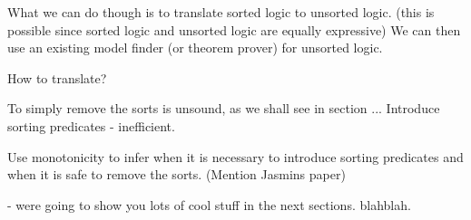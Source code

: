 What we can do though is to translate sorted logic to unsorted logic. 
(this is possible since sorted logic and unsorted logic are equally expressive) 
We can then use an existing model finder (or theorem prover) for unsorted logic.

How to translate?

To simply remove the sorts is unsound, as we shall see in section ...
Introduce sorting predicates - inefficient.

Use monotonicity to infer when it is necessary to introduce sorting predicates
and when it is safe to remove the sorts. (Mention Jasmins paper)

- were going to show you lots of cool stuff in the next sections. blahblah.













